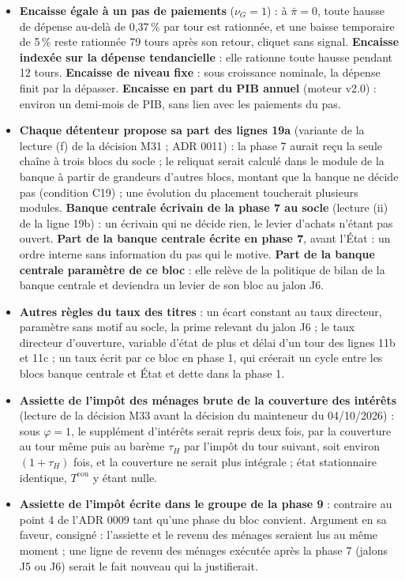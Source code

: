 \documentclass[11pt,a4paper]{article}
\begin{document}
\begin{itemize}
\item \textbf{Encaisse égale à un pas de paiements} ($\nu_G = 1$) : à $\bar\pi = 0$, toute hausse de dépense au-delà de 0,37\,\% par tour est rationnée, et une baisse temporaire de 5\,\% reste rationnée 79 tours après son retour, cliquet sans signal. \textbf{Encaisse indexée sur la dépense tendancielle} : elle rationne toute hausse pendant 12 tours. \textbf{Encaisse de niveau fixe} : sous croissance nominale, la dépense finit par la dépasser. \textbf{Encaisse en part du PIB annuel} (moteur v2.0) : environ un demi-mois de PIB, sans lien avec les paiements du pas.
\item \textbf{Chaque détenteur propose sa part des lignes 19a} (variante de la lecture (f) de la décision M31 ; ADR 0011) : la phase 7 aurait reçu la seule chaîne à trois blocs du socle ; le reliquat serait calculé dans le module de la banque à partir de grandeurs d'autres blocs, montant que la banque ne décide pas (condition C19) ; une évolution du placement toucherait plusieurs modules. \textbf{Banque centrale écrivain de la phase 7 au socle} (lecture (ii) de la ligne 19b) : un écrivain qui ne décide rien, le levier d'achats n'étant pas ouvert. \textbf{Part de la banque centrale écrite en phase 7}, avant l'État : un ordre interne sans information du pas qui le motive. \textbf{Part de la banque centrale paramètre de ce bloc} : elle relève de la politique de bilan de la banque centrale et deviendra un levier de son bloc au jalon J6.
\item \textbf{Autres règles du taux des titres} : un écart constant au taux directeur, paramètre sans motif au socle, la prime relevant du jalon J6 ; le taux directeur d'ouverture, variable d'état de plus et délai d'un tour des lignes 11b et 11c ; un taux écrit par ce bloc en phase 1, qui créerait un cycle entre les blocs banque centrale et État et dette dans la phase 1.
\item \textbf{Assiette de l'impôt des ménages brute de la couverture des intérêts} (lecture de la décision M33 avant la décision du mainteneur du 04/10/2026) : sous $\varphi = 1$, le supplément d'intérêts serait repris deux fois, par la couverture au tour même puis au barème $\tau_H$ par l'impôt du tour suivant, soit environ $(1 + \tau_H)$ fois, et la couverture ne serait plus intégrale ; état stationnaire identique, $T^{\mathrm{cou}}$ y étant nulle.
\item \textbf{Assiette de l'impôt écrite dans le groupe de la phase 9} : contraire au point 4 de l'ADR 0009 tant qu'une phase du bloc convient. Argument en sa faveur, consigné : l'assiette et le revenu des ménages seraient lus au même moment ; une ligne de revenu des ménages exécutée après la phase 7 (jalons J5 ou J6) serait le fait nouveau qui la justifierait.

\end{itemize}
\end{document}

